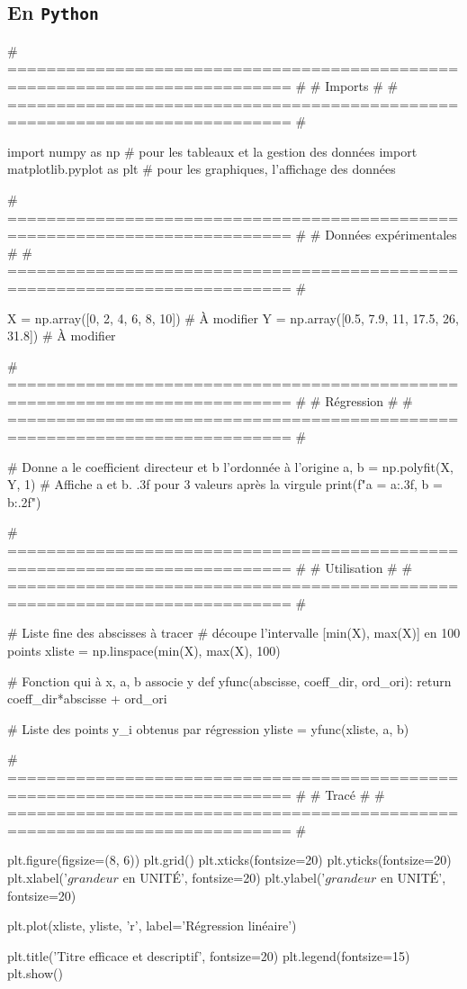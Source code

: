 \documentclass[a4paper, 12pt, garamond]{book}
\begin{document}
\subsection{En \texttt{Python}}
\begin{python}
# =========================================================================== #
#                                   Imports                                   #
# =========================================================================== #

import numpy as np               # pour les tableaux et la gestion des données
import matplotlib.pyplot as plt  # pour les graphiques, l'affichage des données

# =========================================================================== #
#                            Données expérimentales                           #
# =========================================================================== #

X = np.array([0, 2, 4, 6, 8, 10])            # À modifier
Y = np.array([0.5, 7.9, 11, 17.5, 26, 31.8]) # À modifier

# =========================================================================== #
#                                  Régression                                 #
# =========================================================================== #

# Donne a le coefficient directeur et b l'ordonnée à l'origine
a, b = np.polyfit(X, Y, 1)
# Affiche a et b. .3f pour 3 valeurs après la virgule
print(f"a = {a:.3f}, b = {b:.2f}")

# =========================================================================== #
#                                 Utilisation                                 #
# =========================================================================== #

# Liste fine des abscisses à tracer
# découpe l'intervalle [min(X), max(X)] en 100 points
xliste = np.linspace(min(X), max(X), 100)

# Fonction qui à x, a, b associe y
def yfunc(abscisse, coeff_dir, ord_ori):
    return coeff_dir*abscisse + ord_ori

# Liste des points y_i obtenus par régression
yliste = yfunc(xliste, a, b)

# =========================================================================== #
#                                    Tracé                                    #
# =========================================================================== #

plt.figure(figsize=(8, 6))
plt.grid()
plt.xticks(fontsize=20)
plt.yticks(fontsize=20)
plt.xlabel('$grandeur$ en UNITÉ', fontsize=20)
plt.ylabel('$grandeur$ en UNITÉ', fontsize=20)

plt.plot(xliste, yliste,
         'r', label='Régression linéaire')

plt.title('Titre efficace et descriptif', fontsize=20)
plt.legend(fontsize=15)
plt.show()
\end{python}
\end{document}

